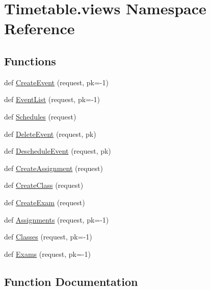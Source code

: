 \hypertarget{namespaceTimetable_1_1views}{}\section{Timetable.\+views Namespace Reference}
\label{namespaceTimetable_1_1views}
\subsection*{Functions}
\begin{DoxyCompactItemize}
\item 
def \hyperlink{namespaceTimetable_1_1views_a724b38ad6f84094b0ee4a74b437bd123}{Create\+Event} (request, pk=-\/1)
\item 
def \hyperlink{namespaceTimetable_1_1views_add50c2c338e962bf4700556c707033bb}{Event\+List} (request, pk=-\/1)
\item 
def \hyperlink{namespaceTimetable_1_1views_aa20aabe7bfe8e3b352cdfbbdc325b6fb}{Schedules} (request)
\item 
def \hyperlink{namespaceTimetable_1_1views_ac5f8c5b343804b6a5f5a0b28f6b8cc6a}{Delete\+Event} (request, pk)
\item 
def \hyperlink{namespaceTimetable_1_1views_a35c252b44035660107fe4a3be1ad5b83}{Deschedule\+Event} (request, pk)
\item 
def \hyperlink{namespaceTimetable_1_1views_a8d1049144d6c9d45c3261ff66dd218f8}{Create\+Assignment} (request)
\item 
def \hyperlink{namespaceTimetable_1_1views_a476e980f5264078a06ad61cae96ac389}{Create\+Class} (request)
\item 
def \hyperlink{namespaceTimetable_1_1views_aae52256fbf1ef404abe04c221343f31f}{Create\+Exam} (request)
\item 
def \hyperlink{namespaceTimetable_1_1views_a0922f7a333865418c4c2ec0a0be06f53}{Assignments} (request, pk=-\/1)
\item 
def \hyperlink{namespaceTimetable_1_1views_a5dc026c70ee8fed98a161847bd100028}{Classes} (request, pk=-\/1)
\item 
def \hyperlink{namespaceTimetable_1_1views_a11fadd4cde00f3724a21c3cb9c89d83a}{Exams} (request, pk=-\/1)
\end{DoxyCompactItemize}


\subsection{Function Documentation}
